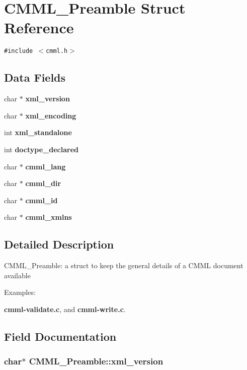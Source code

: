\section{CMML\_\-Preamble Struct Reference}
\label{structCMML__Preamble}
{\tt \#include $<$cmml.h$>$}

\subsection*{Data Fields}
\begin{CompactItemize}
\item 
char $\ast$ {\bf xml\_\-version}
\item 
char $\ast$ {\bf xml\_\-encoding}
\item 
int {\bf xml\_\-standalone}
\item 
int {\bf doctype\_\-declared}
\item 
char $\ast$ {\bf cmml\_\-lang}
\item 
char $\ast$ {\bf cmml\_\-dir}
\item 
char $\ast$ {\bf cmml\_\-id}
\item 
char $\ast$ {\bf cmml\_\-xmlns}
\end{CompactItemize}


\subsection{Detailed Description}
CMML\_\-Preamble: a struct to keep the general details of a CMML document available \begin{Desc}
\item[Examples: ]\par


{\bf cmml-validate.c}, and {\bf cmml-write.c}.\end{Desc}




\subsection{Field Documentation}
\subsubsection{\setlength{\rightskip}{0pt plus 5cm}char$\ast$ {\bf CMML\_\-Preamble::xml\_\-version}}\label{structCMML__Preamble_o0}


